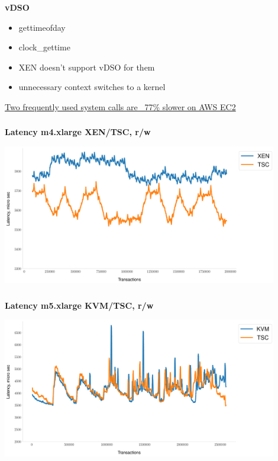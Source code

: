 \documentclass[usenames,dvipsnames, 18pt, compress, aspectratio=169]{beamer}
\begin{document}
\begin{frame}
    \frametitle{}
    \begin{center}
    \textbf{vDSO}

        \begin{itemize}[label={\MVRightarrow}]
            \item gettimeofday
            \item clock\_gettime
            \item XEN doesn't support vDSO for them
            \item unnecessary context switches to a kernel
        \end{itemize}

        \normalsize{\href{
            https://blog.packagecloud.io/eng/2017/03/08/system-calls-are-much-slower-on-ec2/
        }{Two frequently used system calls are ~77\% slower on AWS EC2}}
    \end{center}
\end{frame}

\begin{frame}
    \frametitle{}
    \begin{center}
    \textbf{Latency m4.xlarge XEN/TSC, r/w}

        \includegraphics[width=0.9\textwidth,center]{m4_clock_source_2.png}

    \end{center}
\end{frame}

\begin{frame}
    \frametitle{}
    \begin{center}
    \textbf{Latency m5.xlarge KVM/TSC, r/w}

        \includegraphics[width=0.9\textwidth,center]{m5_clock_source_2.png}

    \end{center}
\end{frame}
\end{document}
